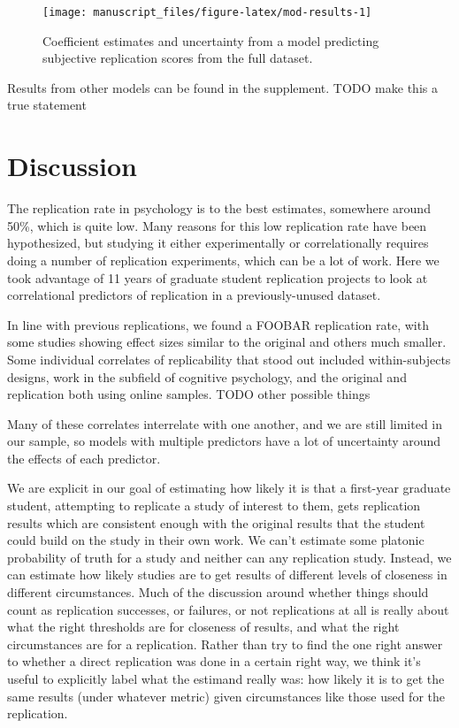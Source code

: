 \documentclass[
  english,
  a4paper,
]{article}
\begin{document}
\begin{figure}[ht]
\texttt{[image: manuscript\_files/figure-latex/mod-results-1]} \caption{Coefficient estimates and uncertainty from a model predicting subjective replication scores from the full dataset.}\label{fig:mod-results}
\end{figure}

Results from other models can be found in the supplement. TODO make this a true statement

\hypertarget{discussion}{%
\section{Discussion}\label{discussion}}

The replication rate in psychology is to the best estimates, somewhere around 50\%, which is quite low. Many reasons for this low replication rate have been hypothesized, but studying it either experimentally or correlationally requires doing a number of replication experiments, which can be a lot of work. Here we took advantage of 11 years of graduate student replication projects to look at correlational predictors of replication in a previously-unused dataset.

In line with previous replications, we found a FOOBAR replication rate, with some studies showing effect sizes similar to the original and others much smaller. Some individual correlates of replicability that stood out included within-subjects designs, work in the subfield of cognitive psychology, and the original and replication both using online samples. TODO other possible things

Many of these correlates interrelate with one another, and we are still limited in our sample, so models with multiple predictors have a lot of uncertainty around the effects of each predictor.

We are explicit in our goal of estimating how likely it is that a first-year graduate student, attempting to replicate a study of interest to them, gets replication results which are consistent enough with the original results that the student could build on the study in their own work. We can't estimate some platonic probability of truth for a study and neither can any replication study. Instead, we can estimate how likely studies are to get results of different levels of closeness in different circumstances. Much of the discussion around whether things should count as replication successes, or failures, or not replications at all is really about what the right thresholds are for closeness of results, and what the right circumstances are for a replication. Rather than try to find the one right answer to whether a direct replication was done in a certain right way, we think it's useful to explicitly label what the estimand really was: how likely it is to get the same results (under whatever metric) given circumstances like those used for the replication.
\end{document}
